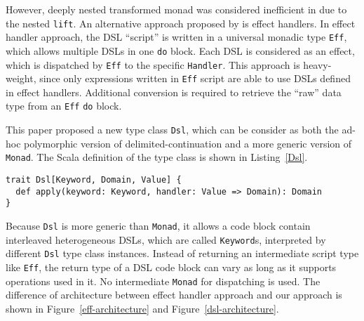 However, deeply nested transformed monad was considered inefficient in  due to the nested \lstinline{lift}. An alternative approach proposed by
\cite{kiselyov2013extensible} is effect handlers. In effect handler approach, the DSL ``script'' is written in a universal monadic type \lstinline{Eff}, which allows multiple DSLs in one \lstinline{do} block. Each DSL is considered as an effect, which is dispatched by \lstinline{Eff} to the specific \lstinline{Handler}. This approach is heavy-weight, since only expressions written in \lstinline{Eff} script are able to use DSLs defined in effect handlers. Additional conversion is required to retrieve the ``raw'' data type from an \lstinline{Eff} \lstinline{do} block.

This paper proposed a new type class \lstinline{Dsl}, which can be consider as both the ad-hoc polymorphic version of delimited-continuation and a more generic version of \lstinline{Monad}. The Scala definition of the type class is shown in Listing~\ref{Dsl}.

\begin{lstlisting}[caption={The definition of \lstinline{Dsl} type class},label={Dsl}]
trait Dsl[Keyword, Domain, Value] {
  def apply(keyword: Keyword, handler: Value => Domain): Domain
}
\end{lstlisting}

Because \lstinline{Dsl} is more generic than \lstinline{Monad}, it allows a code block contain interleaved heterogeneous DSLs, which are called \lstinline{Keyword}s, interpreted by different \lstinline{Dsl} type class instances. Instead of returning an intermediate script type like \lstinline{Eff}, the return type of a DSL code block can vary as long as it supports operations used in it. No intermediate \lstinline{Monad} for dispatching is used. The difference of architecture between effect handler approach and our approach is shown in Figure~\ref{eff-architecture} and Figure~\ref{dsl-architecture}.

